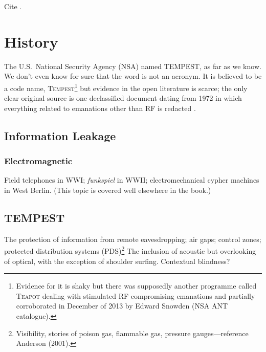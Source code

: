 \documentclass[a4paper,twoside,11pt]{book}
\begin{document}
Cite \cite{Allain2019}.

\section{History}
The U.S.\ National Security Agency (NSA) named TEMPEST, as far as we know. We
don't even know for sure that the word is not an acronym. It is believed to
be a code name, \textsc{Tempest}\footnote{Evidence for it is shaky but there
was supposedly another programme called \textsc{Teapot} dealing with
stimulated RF compromising emanations \cite[p.~539]{Anderson2008a} and
partially corroborated in December of 2013 by Edward Snowden (NSA ANT
catalogue).} but evidence in the open literature is scarce; the only clear
original source is one declassified document dating from 1972 in which
everything related to emanations other than RF is redacted
\cite{NSAtempest2007}.
\subsection{Information Leakage}
\subsubsection{Electromagnetic}
Field telephones in WWI; \emph{funkspiel} in WWII; electromechanical cypher
machines in West Berlin. (This topic is covered well elsewhere in the book.)

\subsection{TEMPEST}
The protection of information from remote eavesdropping; air gaps; control
zones; protected distribution systems (PDS)\footnote{Visibility, stories of
poison gas, flammable gas, pressure gauges---reference Anderson (2001).} The
inclusion of acoustic but overlooking of optical, with the exception of
shoulder surfing. Contextual blindness?
\end{document}
